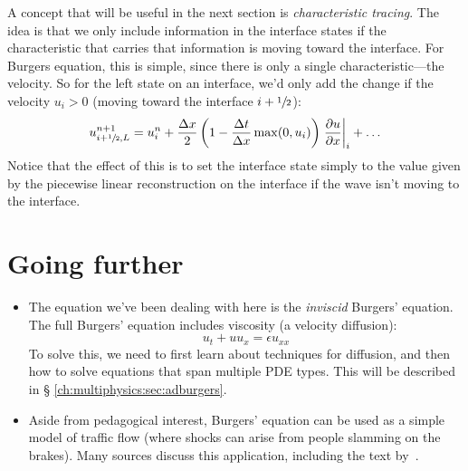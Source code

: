 A concept that will be useful in the next section is {\em
  characteristic tracing}.  The idea is that we only include
information in the interface states if the characteristic that carries
that information is moving toward the interface.  For Burgers equation,
this is simple, since there is only a single characteristic---the velocity.
So for the left state on an interface, we'd only add the change if
the velocity $u_i > 0$ (moving toward the interface $i+{\sfrac{1}{2}}$):
\begin{equation}
u^{n+1}_{i+{\sfrac{1}{2}},L}
 = u^n_i + \frac{\Delta x}{2}
   \left ( 1 - \frac{\Delta t}{\Delta x} \max(0, u_i) \right )
   \left . \frac{\partial u}{\partial x} \right |_i + \ldots
\end{equation}
Notice that the effect of this is to set the interface state simply to
the value given by the piecewise linear reconstruction on the interface
if the wave isn't moving to the interface.

\section{Going further}

\begin{itemize}
\item The equation we've been dealing with here is the {\em inviscid}
  Burgers' equation.  The full Burgers' equation includes viscosity (a
  velocity diffusion):
  \begin{equation}
    u_t + u u_x = \epsilon u_{xx}
  \end{equation}
  To solve this, we need to first learn about techniques for
  diffusion, and then how to solve equations that span multiple PDE
  types.  This will be described in \S
  \ref{ch:multiphysics:sec:adburgers}.

\item Aside from pedagogical interest, Burgers' equation can be used
  as a simple model of traffic flow (where shocks can arise from
  people slamming on the brakes).  Many sources discuss this
  application, including the text by~\cite{leveque:2002}.

\end{itemize}
